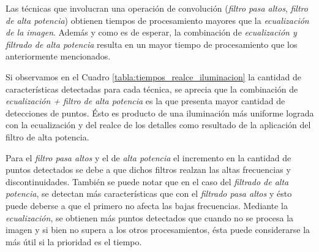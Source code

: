 Las técnicas que involucran una operación de convolución (\textit{filtro pasa altos}, \textit{filtro de alta potencia}) obtienen tiempos de procesamiento mayores que la \textit{ecualización de la imagen}. Además y como es de esperar, la combinación de \textit{ecualización y filtrado de alta potencia} resulta en un mayor tiempo de procesamiento que los anteriormente mencionados.


Si observamos en el Cuadro \ref{tabla:tiempos_realce_iluminacion} la cantidad de características detectadas para cada técnica, se aprecia que la combinación de \textit{ecualización + filtro de alta potencia} es la que presenta mayor cantidad de detecciones de puntos. Ésto es producto de una iluminación más uniforme lograda con la ecualización y del realce de los detalles como resultado de la aplicación del filtro de alta potencia.

Para el \textit{filtro pasa altos} y el de \textit{alta potencia} el incremento en la cantidad de puntos detectados se debe a que dichos filtros realzan las altas frecuencias y discontinuidades. También se puede notar que en el caso del \textit{filtrado de alta potencia}, se detectan más características que con el \textit{filtrado pasa altos} y ésto puede deberse a que el primero no afecta las bajas frecuencias. 
Mediante la \textit{ecualización}, se obtienen más puntos detectados que cuando no se procesa la imagen y si bien no supera a los otros procesamientos, ésta puede considerarse la más útil si la prioridad es el tiempo.

